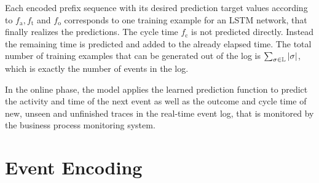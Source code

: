Each encoded prefix sequence with its desired prediction target values according to $f_\mathrm{a}, f_\mathrm{t}$ and $f_\mathrm{o}$ corresponds to one training example for an LSTM network, that finally realizes the predictions.
The cycle time $f_\mathrm{c}$ is not predicted directly.
Instead the remaining time is predicted and added to the already elapsed time.
The total number of training examples that can be generated out of the log is $\sum_{\sigma \in \mathbb{L}}|\sigma|$, which is exactly the number of events in the log.

In the online phase, the model applies the learned prediction function to predict the activity and time of the next event as well as the outcome and cycle time of new, unseen and unfinished traces in the real-time event log, that is monitored by the business process monitoring system.

\section{Event Encoding}\label{sec:event}

